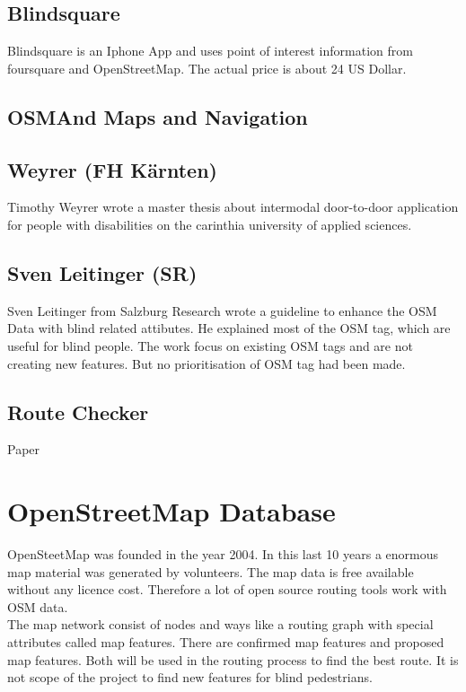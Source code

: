 \documentclass{sig-alternate}
\begin{document}
\subsection{Blindsquare}
Blindsquare\cite{blindsquare} is an Iphone App and uses point of interest information from foursquare and OpenStreetMap. The actual price is about 24 US Dollar. 

\subsection{OSMAnd Maps and Navigation}

\subsection{Weyrer (FH K\"{a}rnten)} 
Timothy Weyrer\cite{weyrer} wrote a master thesis about intermodal door-to-door application for people with disabilities on the carinthia university of applied sciences.

\subsection{Sven Leitinger (SR)}
Sven Leitinger\cite{sven:osm} from Salzburg Research wrote a guideline to enhance the OSM Data with blind related attibutes. He explained most of the OSM tag, which are useful for blind people. The work focus on existing OSM tags and are not creating new features. But no prioritisation of OSM tag had been made. 
\subsection{Route Checker}
Paper

\section{OpenStreetMap Database}
OpenSteetMap was founded in the year 2004. In this last 10 years a enormous map material was generated by volunteers. The map data is free available without any licence cost. Therefore a lot of open source routing tools work with OSM data. \\
The map network consist of nodes and ways like a routing graph with special attributes called map features. There are confirmed map features and proposed map features.  Both will be used in the routing process to find the best route. It is not scope of the project to find new features for blind pedestrians.   
\end{document}
